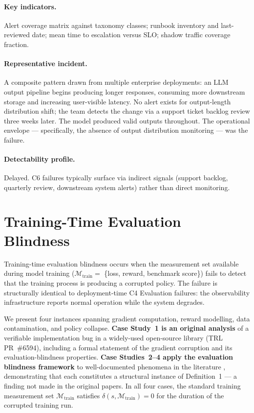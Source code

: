 \documentclass{article}
\begin{document}
\paragraph{Key indicators.}
Alert coverage matrix against taxonomy classes; runbook inventory and
last-reviewed date; mean time to escalation versus SLO; shadow traffic
coverage fraction.

\paragraph{Representative incident.}
A composite pattern drawn from multiple enterprise deployments: an LLM output
pipeline begins producing longer responses, consuming more downstream storage
and increasing user-visible latency.  No alert exists for output-length
distribution shift; the team detects the change via a support ticket backlog
review three weeks later.  The model produced valid outputs throughout.
The operational envelope --- specifically, the absence of output distribution
monitoring --- was the failure.

\paragraph{Detectability profile.}
Delayed.  C6 failures typically surface via indirect signals (support backlog,
quarterly review, downstream system alerts) rather than direct monitoring.

\section{Training-Time Evaluation Blindness}
\label{sec:training}

Training-time evaluation blindness occurs when the measurement set available
during model training ($\mathcal{M}_{\text{train}} =$ \{loss, reward, benchmark
score\}) fails to detect that the training process is producing a corrupted
policy.  The failure is structurally identical to deployment-time C4 Evaluation
failures: the observability infrastructure reports normal operation while the
system degrades.

We present four instances spanning gradient computation, reward modelling,
data contamination, and policy collapse.  \textbf{Case Study~1 is an original
analysis} of a verifiable implementation bug in a widely-used open-source
library (TRL PR~\#6594), including a formal statement of the gradient
corruption and its evaluation-blindness properties.
\textbf{Case Studies~2--4 apply the evaluation blindness framework} to
well-documented phenomena in the literature
\citep{gao2025rewardhacking,shi2024contamination,ouyang2022instructgpt},
demonstrating that each constitutes a structural instance of Definition~1
--- a finding not made in the original papers.  In all four cases, the
standard training measurement set $\mathcal{M}_{\text{train}}$ satisfies
$\delta(s, \mathcal{M}_{\text{train}}) = 0$ for the duration of the
corrupted training run.
\end{document}
